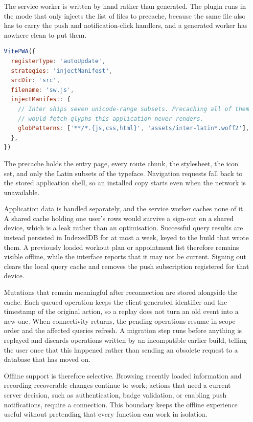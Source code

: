 The service worker is written by hand rather than generated. The plugin runs in the mode that only injects the list of files to precache, because the same file also has to carry the push and notification-click handlers, and a generated worker has nowhere clean to put them.

\begin{lstlisting}[language=JavaScript,caption={The service-worker build configuration, in \texttt{vite.config.js}.},label={lst:injectManifest}]
VitePWA({
  registerType: 'autoUpdate',
  strategies: 'injectManifest',
  srcDir: 'src',
  filename: 'sw.js',
  injectManifest: {
    // Inter ships seven unicode-range subsets. Precaching all of them
    // would fetch glyphs this application never renders.
    globPatterns: ['**/*.{js,css,html}', 'assets/inter-latin*.woff2'],
  },
})
\end{lstlisting}

The precache holds the entry page, every route chunk, the stylesheet, the icon set, and only the Latin subsets of the typeface. Navigation requests fall back to the stored application shell, so an installed copy starts even when the network is unavailable.

Application data is handled separately, and the service worker caches none of it. A shared cache holding one user's rows would survive a sign-out on a shared device, which is a leak rather than an optimisation. Successful query results are instead persisted in IndexedDB for at most a week, keyed to the build that wrote them. A previously loaded workout plan or appointment list therefore remains visible offline, while the interface reports that it may not be current. Signing out clears the local query cache and removes the push subscription registered for that device.

Mutations that remain meaningful after reconnection are stored alongside the cache. Each queued operation keeps the client-generated identifier and the timestamp of the original action, so a replay does not turn an old event into a new one. When connectivity returns, the pending operations resume in scope order and the affected queries refresh. A migration step runs before anything is replayed and discards operations written by an incompatible earlier build, telling the user once that this happened rather than sending an obsolete request to a database that has moved on.

Offline support is therefore selective. Browsing recently loaded information and recording recoverable changes continue to work; actions that need a current server decision, such as authentication, badge validation, or enabling push notifications, require a connection. This boundary keeps the offline experience useful without pretending that every function can work in isolation.

